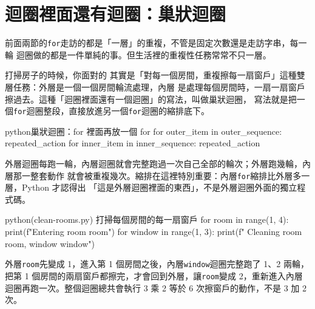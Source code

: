 \section{迴圈裡面還有迴圈：巢狀迴圈}
\label{sec:nested-loops}

前面兩節的\texttt{for}走訪的都是「一層」的重複，不管是固定次數還是走訪字串，每一輪
迴圈做的都是一件單純的事。但生活裡的重複性任務常常不只一層。

打掃房子的時候，你面對的
其實是「對每一個房間，重複擦每一扇窗戶」這種雙層任務：外層是一個一個房間輪流處理，內層
是處理每個房間時，一扇一扇窗戶擦過去。這種「迴圈裡面還有一個迴圈」的寫法，叫做巢狀迴圈，
寫法就是把一個\texttt{for}迴圈整段，直接放進另一個\texttt{for}迴圈的縮排底下。

\begin{code}{python}{巢狀迴圈：for 裡面再放一個 for}
for outer_item in outer_sequence:
    repeated_action
    for inner_item in inner_sequence:
        repeated_action
\end{code}

外層迴圈每跑一輪，內層迴圈就會完整跑過一次自己全部的輪次；外層跑幾輪，內層那一整套動作
就會被重複幾次。縮排在這裡特別重要：內層\texttt{for}縮排比外層多一層，Python 才認得出
「這是外層迴圈裡面的東西」，不是外層迴圈外面的獨立程式碼。

\begin{example}{python}{(clean-rooms.py) 打掃每個房間的每一扇窗戶}
for room in range(1, 4):
    print(f"Entering room {room}")
    for window in range(1, 3):
        print(f"  Cleaning room {room}, window {window}")
\end{example}


外層\texttt{room}先變成 1，進入第 1 個房間之後，內層\texttt{window}迴圈完整跑了 1、2
兩輪，把第 1 個房間的兩扇窗戶都擦完，才會回到外層，讓\texttt{room}變成 2，重新進入內層
迴圈再跑一次。整個迴圈總共會執行 3 乘 2 等於 6 次擦窗戶的動作，不是 3 加 2 次。

